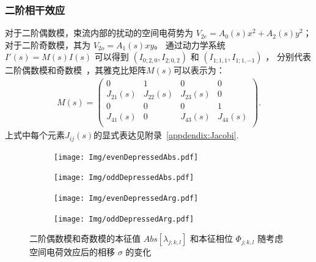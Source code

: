 \subsubsection{二阶相干效应}
对于二阶偶数模，束流内部的扰动的空间电荷势为  $V_{2e} = A_0(s)x^2 + A_2(s)y^2$；
对于二阶奇数模，其为 $V_{2o}=A_1(s)xy$。
通过动力学系统 $I'(s)=M(s)I(s)$ 可以得到 $(I_{0;2,0}, I_{2;0,2})$ 和  $(I_{1;1,1}, I_{1;1,-1})$ ，
分别代表二阶偶数模和奇数模~\cite{11, 12, 18}，其雅克比矩阵$M(s)$可以表示为：
\begin{eqnarray}\label{eq2.5}
M(s)=
\left(
  \begin{array}{cccc}
    0         & 1         & 0         & 0         \\
    J_{21}(s) & J_{22}(s) & J_{23}(s) & 0         \\
    0         & 0         & 0         & 1         \\
    J_{41}(s) & 0         & J_{43}(s) & J_{44}(s) \\
  \end{array}
\right).
\end{eqnarray}
上式中每个元素$J_{ij}(s)$的显式表达见附录~\ref{appdendix:Jacobi}.

\begin{figure}
    \centering
    \begin{subfigure}[b]{0.48\textwidth}
        \texttt{[image: Img/evenDepressedAbs.pdf]}
        \caption{}
        \label{sfig:stopbandEvenAbs}
    \end{subfigure}
    \begin{subfigure}[b]{0.48\textwidth}
        \texttt{[image: Img/oddDepressedAbs.pdf]}
        \caption{}
        \label{sfig:stopbandOddAbs}
    \end{subfigure}

    \begin{subfigure}[b]{0.48\textwidth}
        \texttt{[image: Img/evenDepressedArg.pdf]}
        \caption{}
        \label{sfig:stopbandEvenArg}
    \end{subfigure}
    \begin{subfigure}[b]{0.48\textwidth}
        \texttt{[image: Img/oddDepressedArg.pdf]}
        \caption{}
        \label{sfig:stopbandOddArg}
    \end{subfigure}
    \caption{二阶偶数模和奇数模的本征值 $Abs[\lambda_{j;k,l}]$ 和本征相位 $\Phi_{j;k,l}$ 随考虑空间电荷效应后的相移 $\sigma$ 的变化}
    \label{fig:stopband}
\end{figure}

